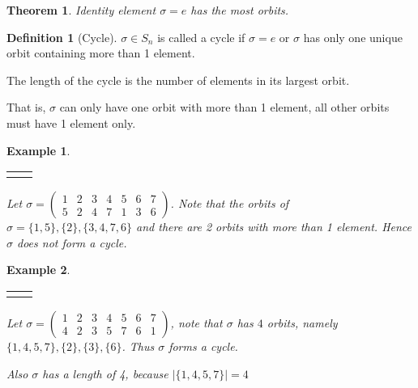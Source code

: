 \documentclass{article}
\theoremstyle{MyNonumberplain}
\theoremstyle{break}
\newcommand{\nline}{\begin{tabular}{ll}&\\\end{tabular}}
\theoremstyle{break}
\newtheorem{theorem}{Theorem}[section]
\newtheorem{example}{Example}[section]
\theoremstyle{break}
\theoremstyle{definition}
\theoremstyle{break}
\newtheorem{definition}{Definition}[section]
\begin{document}
\begin{thmbox}
    \begin{theorem}
        Identity element $\sigma=e$ has the most orbits. 
    \end{theorem}
\end{thmbox}

\begin{defbox}
    \begin{definition}[Cycle]
        $\sigma \in S_n$ is called a cycle if $\sigma = e$ or $\sigma$ has only one unique orbit containing more than 1 element. \bigskip

        The length of the cycle is the number of elements in its largest orbit.
    \end{definition}
\end{defbox}
That is, $\sigma$ can only have one orbit with more than 1 element, all other orbits must have 1 element only.

\begin{expbox}
    \begin{example}

        \nline

        Let $\sigma = \left(\begin{array}{ccccccc}
            1 & 2 & 3 & 4 & 5 & 6 & 7\\
            5 & 2 & 4 & 7 & 1 & 3 & 6
          \end{array}\right)$. Note that the orbits of $\sigma = \{ 1, 5 \}, \{ 2 \}, \{
          3, 4, 7, 6 \}$ and there are 2 orbits with more than 1 element. Hence $\sigma$
          does not form a cycle.
    \end{example}
\end{expbox}

\begin{expbox}
    \begin{example}

        \nline

        Let $\sigma = \left(\begin{array}{ccccccc}
            1 & 2 & 3 & 4 & 5 & 6 & 7\\
            4 & 2 & 3 & 5 & 7 & 6 & 1
          \end{array}\right)$, note that $\sigma$ has $4$ orbits, namely $\{ 1, 4, 5, 7
          \}, \{ 2 \}, \{ 3 \}, \{ 6 \}$. Thus $\sigma$ forms a cycle.\bigskip
          
          Also $\sigma$ has a length of 4, because $| \{ 1, 4, 5, 7 \} | = 4$
    \end{example}
\end{expbox}
\end{document}

